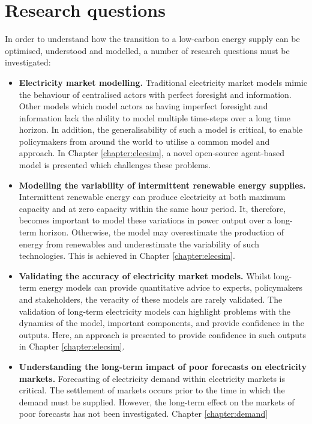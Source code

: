 \section{Research questions}


In order to understand how the transition to a low-carbon energy supply can be optimised, understood and modelled, a number of research questions must be investigated:

\begin{itemize}
	
	
	\item \textbf{Electricity market modelling.} Traditional electricity market models mimic the behaviour of centralised actors with perfect foresight and information. Other models which model actors as having imperfect foresight and information lack the ability to model multiple time-steps over a long time horizon. In addition, the generalisability of such a model is critical, to enable policymakers from around the world to utilise a common model and approach. In Chapter \ref{chapter:elecsim}, a novel open-source agent-based model is presented which challenges these problems.
	
	\item \textbf{Modelling the variability of intermittent renewable energy supplies.} Intermittent renewable energy can produce electricity at both maximum capacity and at zero capacity within the same hour period. It, therefore, becomes important to model these variations in power output over a long-term horizon. Otherwise, the model may overestimate the production of energy from renewables and underestimate the variability of such technologies. This is achieved in Chapter \ref{chapter:elecsim}.
	
	\item \textbf{Validating the accuracy of electricity market models.} Whilst long-term energy models can provide quantitative advice to experts, policymakers and stakeholders, the veracity of these models are rarely validated. The validation of long-term electricity models can highlight problems with the dynamics of the model, important components, and provide confidence in the outputs. Here, an approach is presented to provide confidence in such outputs in Chapter \ref{chapter:elecsim}.
	
	
	\item \textbf{Understanding the long-term impact of poor forecasts on electricity markets.} Forecasting of electricity demand within electricity markets is critical. The settlement of markets occurs prior to the time in which the demand must be supplied. However, the long-term effect on the markets of poor forecasts has not been investigated. Chapter \ref{chapter:demand}
	

\end{itemize}
